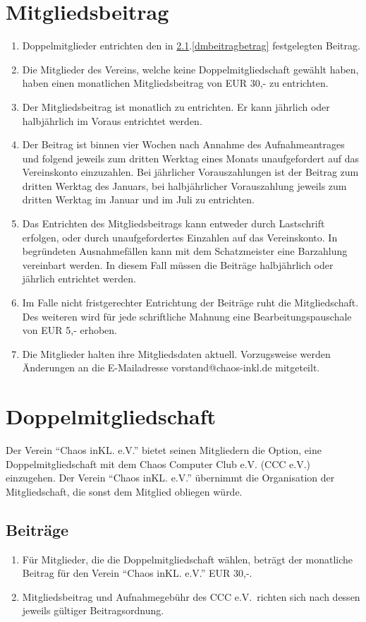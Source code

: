 \documentclass[a4paper, 12pt]{scrartcl}
\begin{document}
\section{Mitgliedsbeitrag}
\begin{enumerate}
	\item Doppelmitglieder entrichten den in \ref{dmbeitrag}.\ref{dmbeitragbetrag} festgelegten Beitrag.
	\item Die Mitglieder des Vereins, welche keine Doppelmitgliedschaft gewählt haben, haben einen monatlichen
    Mitgliedsbeitrag von EUR 30,- zu entrichten.
	\item Der Mitgliedsbeitrag ist monatlich zu entrichten. Er kann jährlich oder halbjährlich im Voraus entrichtet werden.
	\item Der Beitrag ist binnen vier Wochen nach Annahme des Aufnahmeantrages und folgend jeweils zum dritten Werktag eines Monats unaufgefordert auf das Vereinskonto einzuzahlen. Bei jährlicher Vorauszahlungen ist der Beitrag zum dritten Werktag des Januars, bei halbjährlicher Vorauszahlung jeweils zum dritten Werktag im Januar und im Juli zu entrichten.
	\item Das Entrichten des Mitgliedsbeitrags kann entweder durch Lastschrift erfolgen, oder durch unaufgefordertes Einzahlen auf das Vereinskonto. In begründeten Ausnahmefällen kann mit dem Schatzmeister eine Barzahlung vereinbart werden. In diesem Fall müssen die Beiträge halbjährlich oder jährlich entrichtet werden.
	\item Im Falle nicht fristgerechter Entrichtung der Beiträge ruht die Mitgliedschaft. Des weiteren wird für jede schriftliche Mahnung eine Bearbeitungspauschale von EUR 5,- erhoben.
	\item Die Mitglieder halten ihre Mitgliedsdaten aktuell. Vorzugsweise
    werden Änderungen an die E-Mailadresse
    vorstand@chaos-inkl.de mitgeteilt. 
\end{enumerate}

\section{Doppelmitgliedschaft}\label{dm}
Der Verein "`Chaos inKL. e.V."' bietet seinen Mitgliedern die Option, eine Doppelmitgliedschaft mit dem Chaos Computer Club e.V. (CCC e.V.) einzugehen. Der Verein "`Chaos inKL. e.V."' übernimmt die Organisation der Mitgliedschaft, die sonst dem Mitglied obliegen würde.

\subsection{Beiträge}\label{dmbeitrag}
\begin{enumerate}
	\item \label{dmbeitragbetrag}Für Mitglieder, die die Doppelmitgliedschaft wählen, beträgt der monatliche Beitrag für den Verein "`Chaos inKL. e.V."' EUR 30,-.
	\item Mitgliedsbeitrag und Aufnahmegebühr des CCC e.V.\ richten sich nach dessen jeweils gültiger Beitragsordnung.
\end{enumerate}
\end{document}
